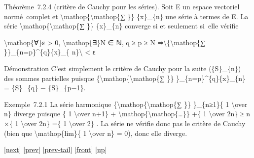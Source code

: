 \documentclass[]{article}
\begin{document}
Théorème~7.2.4 (critère de Cauchy pour les séries). Soit E un espace
vectoriel normé~complet et
\textbackslash{}mathop\{\textbackslash{}mathop\{∑ \}\} \{x\}\_\{n\} une
série à termes de E. La série
\textbackslash{}mathop\{\textbackslash{}mathop\{∑ \}\} \{x\}\_\{n\}
converge si et seulement si~elle vérifie

\textbackslash{}mathop\{∀\}ε \textgreater{} 0,
\textbackslash{}mathop\{∃\}N ∈ ℕ, q ≥ p ≥ N
⇒\textbackslash{}\textbar{}\{\textbackslash{}mathop\{∑
\}\}\_\{n=p\}\^{}\{q\}\{x\}\_\{ n\}\textbackslash{}\textbar{}
\textless{} ε

Démonstration C'est simplement le critère de Cauchy pour la suite
(\{S\}\_\{n\}) des sommes partielles puisque
\{\textbackslash{}mathop\{\textbackslash{}mathop\{∑ \}\}
\}\_\{n=p\}\^{}\{q\}\{x\}\_\{n\} = \{S\}\_\{q\} − \{S\}\_\{p−1\}.

Exemple~7.2.1 La série harmonique
\{\textbackslash{}mathop\{\textbackslash{}mathop\{∑ \}\} \}\_\{n≥1\}\{ 1
\textbackslash{}over n\} diverge puisque \{ 1 \textbackslash{}over n+1\}
+ \textbackslash{}mathop\{\textbackslash{}mathop\{\ldots{}\}\} +\{ 1
\textbackslash{}over 2n\} ≥ n ×\{ 1 \textbackslash{}over 2n\} =\{ 1
\textbackslash{}over 2\} . La série ne vérifie donc pas le critère de
Cauchy (bien que \textbackslash{}mathop\{lim\}\{ 1 \textbackslash{}over
n\} = 0), donc elle diverge.

{[}\href{coursse37.html}{next}{]} {[}\href{coursse35.html}{prev}{]}
{[}\href{coursse35.html\#tailcoursse35.html}{prev-tail}{]}
{[}\href{coursse36.html}{front}{]}
{[}\href{coursch8.html\#coursse36.html}{up}{]}
\end{document}
